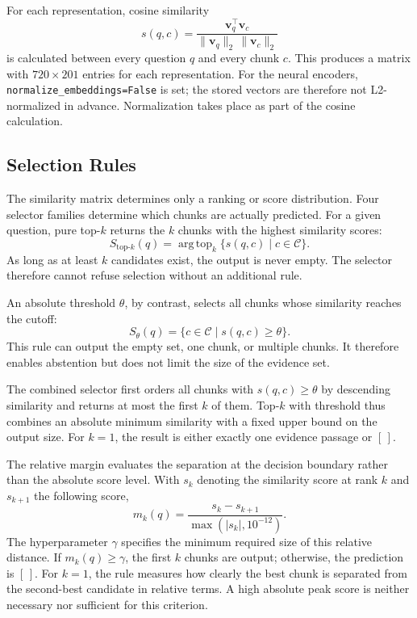 \documentclass[11pt]{article}
\begin{document}
For each representation, cosine similarity
\begin{equation}
s(q,c)=\frac{\mathbf{v}_q^\top\mathbf{v}_c}
{\lVert\mathbf{v}_q\rVert_2\,\lVert\mathbf{v}_c\rVert_2}
\end{equation}
is calculated between every question $q$ and every chunk $c$. This produces a matrix with $720\times201$ entries for each representation. For the neural encoders, \texttt{normalize\_embeddings=False} is set; the stored vectors are therefore not L2-normalized in advance. Normalization takes place as part of the cosine calculation.

\subsection{Selection Rules}

The similarity matrix determines only a ranking or score distribution. Four selector families determine which chunks are actually predicted. For a given question, pure top-$k$ returns the $k$ chunks with the highest similarity scores:
\begin{equation}
S_{\mathrm{top}\text{-}k}(q)=\operatorname{arg\,top}_{k}
\{s(q,c)\mid c\in\mathcal{C}\}.
\end{equation}
As long as at least $k$ candidates exist, the output is never empty. The selector therefore cannot refuse selection without an additional rule.

An absolute threshold $\theta$, by contrast, selects all chunks whose similarity reaches the cutoff:
\begin{equation}
S_{\theta}(q)=\{c\in\mathcal{C}\mid s(q,c)\geq\theta\}.
\end{equation}
This rule can output the empty set, one chunk, or multiple chunks. It therefore enables abstention but does not limit the size of the evidence set.

The combined selector first orders all chunks with $s(q,c)\geq\theta$ by descending similarity and returns at most the first $k$ of them. Top-$k$ with threshold thus combines an absolute minimum similarity with a fixed upper bound on the output size. For $k=1$, the result is either exactly one evidence passage or $[\,]$.

The relative margin evaluates the separation at the decision boundary rather than the absolute score level. With $s_k$ denoting the similarity score at rank $k$ and $s_{k+1}$ the following score,
\begin{equation}
m_k(q)=\frac{s_k-s_{k+1}}{\max(|s_k|,10^{-12})}.
\end{equation}
The hyperparameter $\gamma$ specifies the minimum required size of this relative distance. If $m_k(q)\geq\gamma$, the first $k$ chunks are output; otherwise, the prediction is $[\,]$. For $k=1$, the rule measures how clearly the best chunk is separated from the second-best candidate in relative terms. A high absolute peak score is neither necessary nor sufficient for this criterion.
\end{document}
